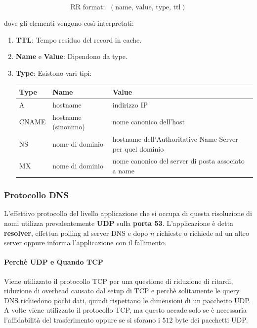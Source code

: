 \documentclass{article}
\begin{document}
\[ \boxed{\text{RR format}: \:\: ( \text{name, value, type, ttl})} \]

\vspace*{10px}

dove gli elementi vengono così interpretati:

\begin{enumerate}
    \item \textbf{TTL}: Tempo residuo del record in cache.
    \item \textbf{Name} e \textbf{Value}: Dipendono da type.
    \item \textbf{Type}: Esistono vari tipi:
    \vspace*{5px}
    \begin{center}
        \begin{tabular}{|l|l|p{}|}
        \hline
        \textbf{Type} & \textbf{Name} & \textbf{Value} \\
        \hline
        A & hostname & indirizzo IP \\
        \hline
        CNAME & hostname (sinonimo) & nome canonico dell'host \\
        \hline
        NS & nome di dominio & hostname dell'Authoritative Name Server per quel dominio \\
        \hline
        MX & nome di dominio & nome canonico del server di posta associato a name \\
        \hline
        \end{tabular}
    \end{center}
\end{enumerate}

\vspace*{15px}

\subsubsection{Protocollo DNS}

L'effettivo protocollo del livello applicazione che si occupa di questa risoluzione di nomi utilizza prevalentemente \textbf{UDP} sulla \textbf{porta 53}.
L'applicazione è detta \textbf{resolver}, effettua polling al server DNS e dopo $n$ richieste o richiede ad un altro server oppure informa l'applicazione con il fallimento.

\vspace*{10px}

\paragraph{Perchè UDP e Quando TCP} Viene utilizzato il protocollo TCP per una questione di riduzione di ritardi, riduzione di overhead causato dal setup di TCP e perchè solitamente le query DNS richiedono pochi dati, quindi rispettano le dimensioni di un pacchetto UDP. A volte viene utilizzato il protocollo TCP, ma questo
accade solo se è necessaria l'affidabilità del trasferimento oppure se si sforano i $512$ byte dei pacchetti UDP.
\end{document}
